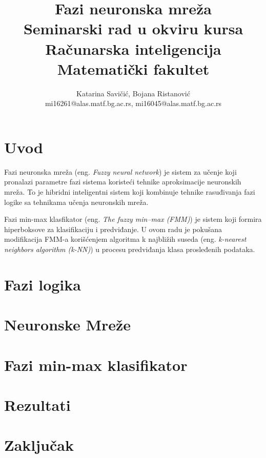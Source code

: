 \documentclass[a4paper]{article}
\begin{document}
\title{Fazi neuronska mreža\\ \small{Seminarski rad u okviru kursa\\Računarska inteligencija\\ Matematički fakultet}}

\author{Katarina Savičić, Bojana Ristanović\\ mi16261@alas.matf.bg.ac.rs, mi16045@alas.matf.bg.ac.rs}

\maketitle

\tableofcontents

\newpage

\section{Uvod}
\label{sec:uvod}

Fazi neuronska mreža (eng. \emph{Fuzzy neural network}) je sistem za učenje koji pronalazi parametre fazi sistema koristeći tehnike aproksimacije neuronskih mreža. To je hibridni inteligentni sistem koji kombinuje tehnike rasuđivanja fazi logike sa tehnikama učenja neuronskih mreža.\cite{fnn}

Fazi min-max klasfikator (eng. \emph{The fuzzy min–max (FMM)}) je sistem koji formira hiperboksove za klasifikaciju i predviđanje. U ovom radu je pokušana modifikacija FMM-a korišćenjem algoritma k najbližih suseda (eng. \emph{k-nearest neighbors algorithm (k-NN)}) u procesu predviđanja klasa prosleđenih podataka.

\section{Fazi logika}
\label{neuronskemreze}


\section{Neuronske Mreže}
\label{neuronskemreze}


\section{Fazi min-max klasifikator}
\label{neuronskemreze}


\section{Rezultati}
\label{neuronskemreze}


\section{Zaključak}
\label{sec:zakljucak}

\appendix
 


\newpage
\appendix
\end{document}
